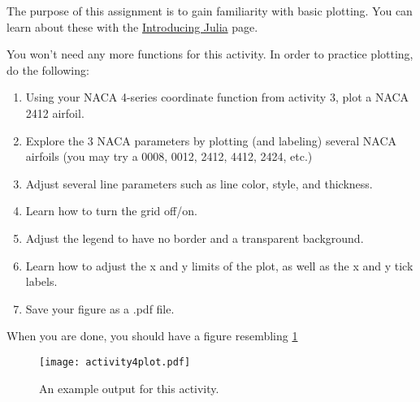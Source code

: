 \documentclass{article}%
\begin{document}
The purpose of this assignment is to gain familiarity with basic plotting. You can learn about these with the \href{https://en.wikibooks.org/wiki/Introducing_Julia/Plotting}{Introducing Julia} page.

\bigskip

You won't need any more functions for this activity. In order to practice plotting, do the following:
\begin{enumerate}
	\item Using your NACA 4-series coordinate function from activity 3, plot a NACA 2412 airfoil.
	\item Explore the 3 NACA parameters by plotting (and labeling) several NACA airfoils (you may try a 0008, 0012, 2412, 4412, 2424, etc.)
	\item Adjust several line parameters such as line color, style, and thickness.
	\item Learn how to turn the grid off/on.
	\item Adjust the legend to have no border and a transparent background.
	\item Learn how to adjust the x and y limits of the plot, as well as the x and y tick labels.
	\item Save your figure as a .pdf file. 
\end{enumerate}

When you are done, you should have a figure resembling \cref{fig:airfoilplot}


\begin{figure}[h!]
	\centering
	\texttt{[image: activity4plot.pdf]}
	\caption{An example output for this activity.}
	\label{fig:airfoilplot}
\end{figure}
\end{document}
